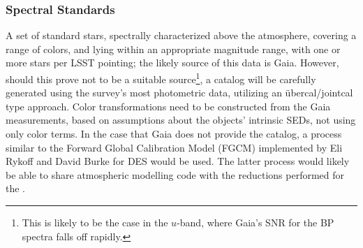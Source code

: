%
%

\subsubsection{Spectral Standards}\label{sec:CPP:output:spectralStandards}
A set of standard stars, spectrally characterized above the atmosphere, covering a range of colors, and lying within an appropriate magnitude range, with one or more stars per LSST pointing; the likely source of this data is Gaia. However, should this prove not to be a suitable source\footnote{ This is likely to be the case in the $u$-band, where Gaia's SNR for the BP spectra falls off rapidly.}, a catalog will be carefully generated using the survey's most photometric data, utilizing an \"ubercal/jointcal type approach.
\alg Color transformations need to be constructed from the Gaia measurements, based on assumptions about the objects' intrinsic SEDs, \ie not using only color terms. In the case that Gaia does not provide the catalog, a process similar to the Forward Global Calibration Model (FGCM) implemented by Eli Rykoff and David Burke for DES would be used. The latter process would likely be able to share atmospheric modelling code with the reductions performed for the \auxtelescope.


